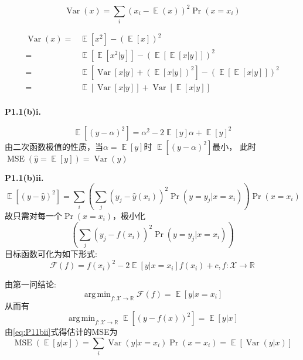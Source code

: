 \documentclass{article}
\DeclareMathOperator{\E}{\mathbb{E}}
\DeclareMathOperator{\Var}{Var}
\DeclareMathOperator{\MSE}{MSE}
\DeclareMathOperator*{\argmin}{\arg\,\min}
\begin{document}
\begin{equation}
\Var(x)=\sum_i (x_i-\E(x))^2\Pr(x=x_i)
\end{equation}

\begin{align*}
\Var(x)=& \E[x^2]-(\E[x])^2\\
=& \E[\E[x^2|y]]-(\E[\E[x|y]])^2\\
=& \E[\Var[x|y]+(\E[x|y])^2]-(\E[\E[x|y]])^2\\
=& \E[\Var[x|y]]+\Var[\E[x|y]]\\
\end{align*}

\textbf{P1.1(b)i.}

\begin{equation}
\E[(y-\alpha)^2]=\alpha^2-2\E[y]\alpha+\E[y]^2
\end{equation}
由二次函数极值的性质，当$\alpha=\E[y]$时 $\E[(y-\alpha)^2]$最小，
此时$\MSE(\hat{y}=\E[y])=\Var(y)$

\textbf{P1.1(b)ii.}
\begin{equation}\label{eq:P11bii}
\E[(y-\hat{y})^2]=\sum_{i}\left(\sum_j (y_j-\hat{y}(x_i))^2\Pr(y=y_j|x=x_i)\right)\Pr(x=x_i)
\end{equation}
故只需对每一个$\Pr(x=x_i)$，极小化
\begin{equation}
\left(\sum_j (y_j-f(x_i))^2\Pr(y=y_j|x=x_i)\right)
\end{equation}
目标函数可化为如下形式:
\begin{equation}
\mathcal{F}(f)=f(x_i)^2-2\E[y|x=x_i]f(x_i)+c,f:\mathcal{X}\rightarrow \mathbb{R}
\end{equation}

由第一问结论:
\begin{equation}
\argmin_{f:\mathcal{X}\rightarrow \mathbb{R}}\mathcal{F}(f)=\E[y|x=x_i]
\end{equation}
从而有
\begin{equation}
\argmin_{f:\mathcal{X}\rightarrow \mathbb{R}}\E[(y-f(x))^2]=\E[y|x]
\end{equation}
由\eqref{eq:P11bii}式得估计的MSE为
\begin{equation}
\MSE(\E[y|x])=\sum_{i}\Var(y|x=x_i)\Pr(x=x_i)=\E[\Var(y|x)]
\end{equation}
\end{document}
